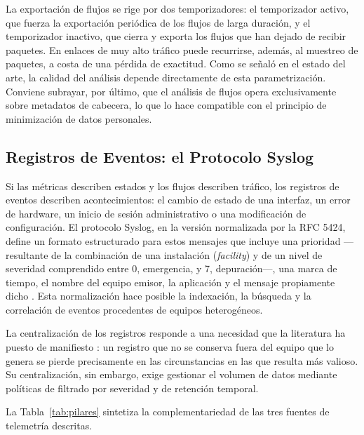 La exportación de flujos se rige por dos temporizadores: el temporizador activo, que fuerza la exportación periódica de los flujos de larga duración, y el temporizador inactivo, que cierra y exporta los flujos que han dejado de recibir paquetes. En enlaces de muy alto tráfico puede recurrirse, además, al muestreo de paquetes, a costa de una pérdida de exactitud. Como se señaló en el estado del arte, la calidad del análisis depende directamente de esta parametrización. Conviene subrayar, por último, que el análisis de flujos opera exclusivamente sobre metadatos de cabecera, lo que lo hace compatible con el principio de minimización de datos personales.

\subsection{Registros de Eventos: el Protocolo Syslog}

Si las métricas describen estados y los flujos describen tráfico, los registros de eventos describen acontecimientos: el cambio de estado de una interfaz, un error de hardware, un inicio de sesión administrativo o una modificación de configuración. El protocolo Syslog, en la versión normalizada por la RFC 5424, define un formato estructurado para estos mensajes que incluye una prioridad ---resultante de la combinación de una instalación (\textit{facility}) y de un nivel de severidad comprendido entre 0, emergencia, y 7, depuración---, una marca de tiempo, el nombre del equipo emisor, la aplicación y el mensaje propiamente dicho \cite{gerhards2009syslog}. Esta normalización hace posible la indexación, la búsqueda y la correlación de eventos procedentes de equipos heterogéneos.

La centralización de los registros responde a una necesidad que la literatura ha puesto de manifiesto \cite{he2016experience, vaarandi2015logcluster}: un registro que no se conserva fuera del equipo que lo genera se pierde precisamente en las circunstancias en las que resulta más valioso. Su centralización, sin embargo, exige gestionar el volumen de datos mediante políticas de filtrado por severidad y de retención temporal.

La Tabla~\ref{tab:pilares} sintetiza la complementariedad de las tres fuentes de telemetría descritas.


